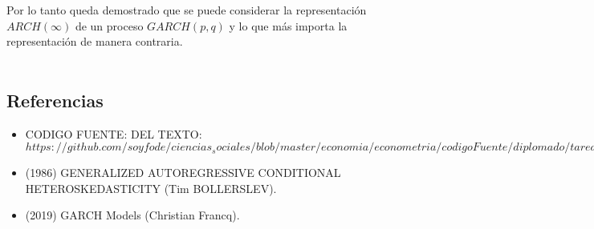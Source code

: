 Por lo tanto queda demostrado que se puede considerar la representación $ARCH(\infty)$ de un proceso $GARCH(p,q)$ y lo que más importa la representación de manera contraria.\\\\

\subsection*{Referencias}
\begin{itemize}
    \item CODIGO FUENTE: DEL TEXTO: $https://github.com/soyfode/ciencias_sociales/blob/master/economia/econometria/codigoFuente/diplomado/tarea_finanz.tex.$
    \item (1986) GENERALIZED AUTOREGRESSIVE CONDITIONAL HETEROSKEDASTICITY (Tim BOLLERSLEV).
    \item (2019) GARCH Models (Christian Francq).
\end{itemize}
